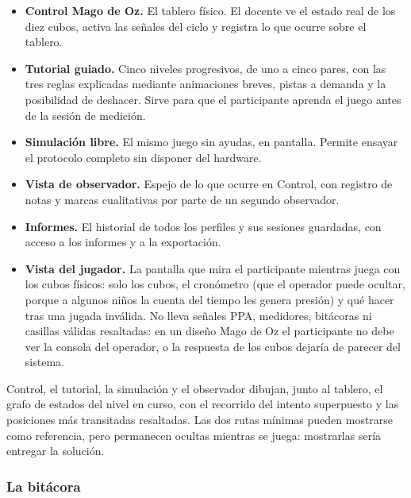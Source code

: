 \documentclass{book}
\begin{document}
\begin{itemize}
    \item \textbf{Control Mago de Oz.} El tablero físico. El docente ve el
    estado real de los diez cubos, activa las señales del ciclo y registra
    lo que ocurre sobre el tablero.

    \item \textbf{Tutorial guiado.} Cinco niveles progresivos, de uno a
    cinco pares, con las tres reglas explicadas mediante animaciones
    breves, pistas a demanda y la posibilidad de deshacer. Sirve para que
    el participante aprenda el juego antes de la sesión de medición.

    \item \textbf{Simulación libre.} El mismo juego sin ayudas, en
    pantalla. Permite ensayar el protocolo completo sin disponer del
    hardware.

    \item \textbf{Vista de observador.} Espejo de lo que ocurre en
    Control, con registro de notas y marcas cualitativas por parte de un
    segundo observador.

    \item \textbf{Informes.} El historial de todos los perfiles y sus
    sesiones guardadas, con acceso a los informes y a la exportación.

    \item \textbf{Vista del jugador.} La pantalla que mira el participante
    mientras juega con los cubos físicos: solo los cubos, el cronómetro (que
    el operador puede ocultar, porque a algunos niños la cuenta del tiempo
    les genera presión) y qué hacer tras una jugada inválida. No lleva
    señales PPA, medidores, bitácoras ni casillas válidas resaltadas: en un
    diseño Mago de Oz el participante no debe ver la consola del operador, o
    la respuesta de los cubos dejaría de parecer del sistema.
\end{itemize}

Control, el tutorial, la simulación y el observador dibujan, junto al tablero, el grafo de estados del
nivel en curso, con el recorrido del intento superpuesto y las posiciones
más transitadas resaltadas. Las dos rutas mínimas pueden mostrarse como
referencia, pero permanecen ocultas mientras se juega: mostrarlas sería
entregar la solución.

\subsubsection{La bitácora}
\end{document}
